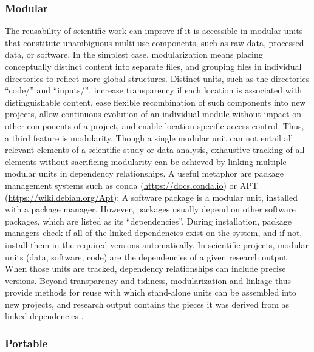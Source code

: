 \subsubsection{Modular}

The reusability of scientific work can improve if it is accessible in modular units that constitute unambiguous multi-use components, such as raw data, processed data, or software.
In the simplest case, modularization means placing conceptually distinct content into separate files, and grouping files in individual directories to reflect more global structures.
Distinct units, such as the directories ``code/'' and ``inputs/'', increase transparency if each location is associated with distinguishable content, ease flexible recombination of such components into new projects, allow continuous evolution of an individual module without impact on other components of a project, and enable location-specific access control.
Thus, a third feature is modularity.
Though a single modular unit can not entail all relevant elements of a scientific study or data analysis, exhaustive tracking of all elements without sacrificing modularity can be achieved by linking multiple modular units in dependency relationships.
A useful metaphor are package management systems such as conda (\url{https://docs.conda.io}) or APT (\url{https://wiki.debian.org/Apt}): A software package is a modular unit, installed with a package manager.
However, packages usually depend on other software packages, which are listed as its ``dependencies''.
During installation, package managers check if all of the linked dependencies exist on the system, and if not, install them in the required versions automatically.
In scientific projects, modular units (data, software, code) are the dependencies of a given research output.
When those units are tracked, dependency relationships can include precise versions.
Beyond transparency and tidiness, modularization and linkage thus provide methods for reuse with which stand-alone units can be assembled into new projects, and research output contains the pieces it was derived from as linked dependencies \citep{bechhofer2010research}.


\subsubsection{Portable}

